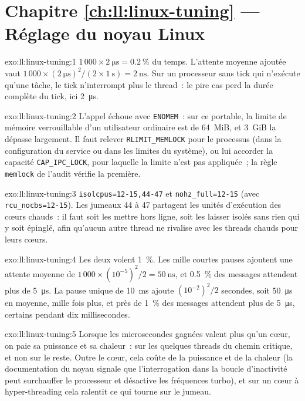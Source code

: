 \section*{Chapitre \ref{ch:ll:linux-tuning} --- Réglage du noyau Linux}

\begin{solution}{exo:ll:linux-tuning:1}
$1\,000 \times \qty{2}{\micro\second} = 0.2~\%$ du temps. L'attente moyenne ajoutée vaut $1\,000 \times (\qty{2}{\micro\second})^2 /
(2 \times \qty{1}{\second}) = \qty{2}{\nano\second}$. Sur un processeur sans tick qui n'exécute qu'une tâche, le tick n'interrompt plus
le thread~: le pire cas perd la durée complète du tick, ici \qty{2}{\micro\second}.
\end{solution}

\begin{solution}{exo:ll:linux-tuning:2}
L'appel échoue avec \texttt{ENOMEM}~: sur ce portable, la limite de mémoire verrouillable d'un utilisateur ordinaire est de 64~MiB,
et 3~GiB la dépasse largement. Il faut relever \texttt{RLIMIT\_MEMLOCK} pour le processus (dans la configuration du service ou
dans les limites du système), ou lui accorder la capacité \texttt{CAP\_IPC\_LOCK}, pour laquelle la limite n'est pas appliquée~; la règle \texttt{memlock} de l'audit vérifie la première.
\end{solution}

\begin{solution}{exo:ll:linux-tuning:3}
\texttt{isolcpus=12-15,44-47} et \texttt{nohz\_full=12-15} (avec \texttt{rcu\_nocbs=12-15}). Les jumeaux 44 à 47 partagent les
unités d'exécution des cœurs chauds~: il faut soit les mettre hors ligne, soit les laisser isolés sans rien qui y soit épinglé,
afin qu'aucun autre thread ne rivalise avec les threads chauds pour leurs cœurs.
\end{solution}

\begin{solution}{exo:ll:linux-tuning:4}
Les deux volent 1~\%. Les mille courtes pauses ajoutent une attente moyenne de $1\,000 \times (10^{-5})^2/2 = \qty{50}{\nano\second}$, et 0.5~\%
des messages attendent plus de \qty{5}{\micro\second}. La pause unique de \qty{10}{\milli\second} ajoute $(10^{-2})^2/2$ secondes,
soit \qty{50}{\micro\second} en moyenne, mille fois plus, et près de 1~\% des messages attendent plus de
\qty{5}{\micro\second}, certains pendant dix millisecondes.
\end{solution}

\begin{solution}{exo:ll:linux-tuning:5}
Lorsque les microsecondes gagnées valent plus qu'un cœur, on paie sa puissance et sa chaleur~: sur les quelques threads du chemin critique, et non sur le reste.
Outre le cœur, cela coûte de la puissance et de la chaleur (la documentation du noyau signale que l'interrogation dans la boucle d'inactivité peut surchauffer le processeur et désactive les fréquences turbo),
et sur un cœur à hyper-threading cela ralentit ce qui tourne sur le jumeau.
\end{solution}

